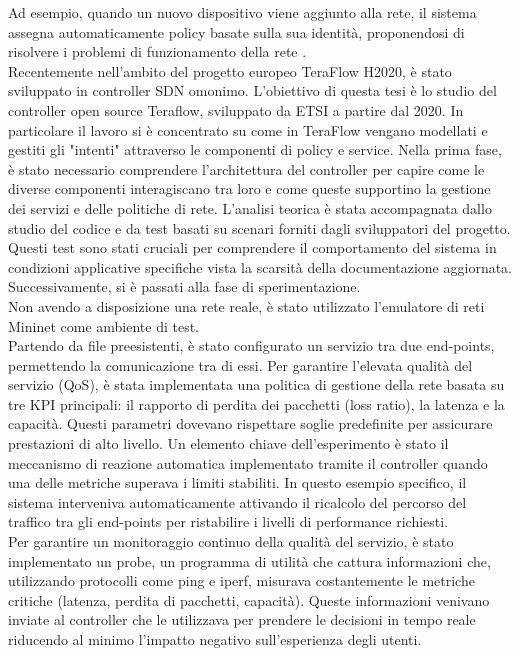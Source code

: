 Ad esempio, quando un nuovo dispositivo viene aggiunto alla rete, 
il sistema assegna automaticamente policy basate sulla sua identità, proponendosi di risolvere i problemi di funzionamento della rete \cite{qoe}.
\\Recentemente nell'ambito del progetto europeo TeraFlow H2020, è stato sviluppato in controller SDN omonimo. 
L'obiettivo di questa tesi è lo studio del controller open source Teraflow, sviluppato da ETSI \cite{etsi} a partire dal 2020.
In particolare il lavoro si è concentrato su come in TeraFlow vengano modellati e gestiti gli "intenti" attraverso le componenti di policy e service.
Nella prima fase, è stato necessario comprendere l'architettura del controller per capire come le diverse componenti interagiscano tra loro e come queste supportino la gestione dei servizi e delle politiche di rete.
L'analisi teorica è stata accompagnata dallo studio del codice e da test basati su scenari forniti dagli sviluppatori del progetto. 
Questi test sono stati cruciali per comprendere il comportamento del sistema in condizioni applicative specifiche vista la scarsità della documentazione aggiornata.
Successivamente, si è passati alla fase di sperimentazione.
\\Non avendo a disposizione una rete reale, è stato utilizzato l'emulatore di reti Mininet come ambiente di test.
\\Partendo da file preesistenti, è stato configurato un servizio tra due end-points, permettendo la comunicazione tra di essi. 
Per garantire l'elevata qualità del servizio (QoS), è stata implementata una politica di 
gestione della rete basata su tre KPI principali: il rapporto di perdita dei pacchetti (loss ratio), la latenza e la capacità. 
Questi parametri dovevano rispettare soglie predefinite per assicurare prestazioni di alto livello.
Un elemento chiave dell'esperimento è stato il meccanismo di reazione automatica implementato tramite il controller quando una delle metriche superava i limiti stabiliti.
In questo esempio specifico, il sistema interveniva automaticamente attivando il ricalcolo del percorso del traffico tra gli end-points per ristabilire i livelli di performance richiesti. 
\\Per garantire un monitoraggio continuo della qualità del servizio, è stato implementato un probe, un programma di utilità che cattura informazioni che, 
utilizzando protocolli come ping e iperf, misurava costantemente le metriche critiche (latenza, perdita di pacchetti, capacità). 
Queste informazioni venivano inviate al controller che le utilizzava per prendere le decisioni in tempo reale riducendo al minimo l'impatto negativo sull'esperienza degli utenti. 
